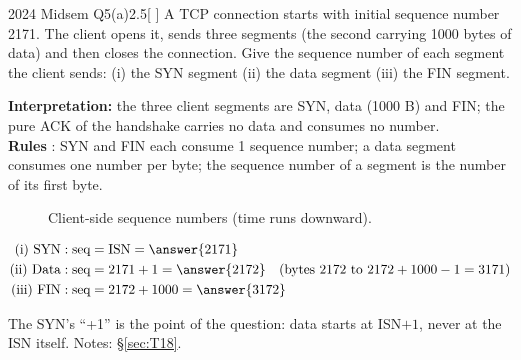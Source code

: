 \begin{question}{2024 Midsem Q5(a)}{2.5}[ ]
A TCP connection starts with initial sequence number 2171. The client opens it, sends three segments (the second carrying 1000 bytes of data) and then closes the connection. Give the sequence number of each segment the client sends: (i) the SYN segment (ii) the data segment (iii) the FIN segment.
\end{question}
\label{q:MS2024-5a}
\begin{solution}
\textbf{Interpretation:} the three client segments are SYN, data (1000 B) and FIN; the pure ACK of the handshake carries no data and consumes no number.\\
\textbf{Rules} : SYN and FIN each consume 1 sequence number; a data segment consumes one number per byte; the sequence number of a segment is the number of its first byte.
\begin{figure}[H]\centering
{}
\caption{Client-side sequence numbers (time runs downward).}
\end{figure}
\begin{align*}
  \text{(i) SYN} &: \text{seq} = \text{ISN} = \answer{2171}\\
  \text{(ii) Data} &: \text{seq} = 2171+1 = \answer{2172}\quad(\text{bytes } 2172\text{ to } 2172+1000-1=3171)\\
  \text{(iii) FIN} &: \text{seq} = 2172+1000 = \answer{3172}
\end{align*}
\end{solution}
\begin{examtip}The SYN's ``+1'' is the point of the question: data starts at ISN$+1$, never at the ISN itself. Notes: \S\ref{sec:T18}.\end{examtip}

